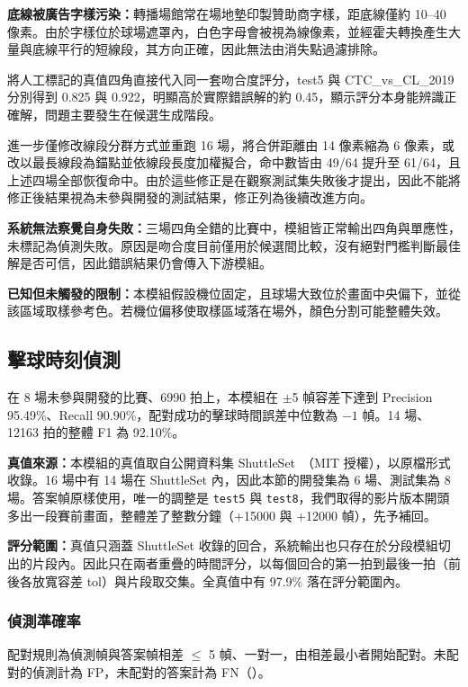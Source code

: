 \textbf{底線被廣告字樣污染：}轉播場館常在場地墊印製贊助商字樣，距底線僅約 10--40 像素。由於字樣位於球場遮罩內，白色字母會被視為線像素，並經霍夫轉換產生大量與底線平行的短線段，其方向正確，因此無法由消失點過濾排除。

將人工標記的真值四角直接代入同一套吻合度評分，test5 與 CTC\_vs\_CL\_2019 分別得到 0.825 與 0.922，明顯高於實際錯誤解的約 0.45，顯示評分本身能辨識正確解，問題主要發生在候選生成階段。

進一步僅修改線段分群方式並重跑 16 場，將合併距離由 14 像素縮為 6 像素，或改以最長線段為錨點並依線段長度加權擬合，命中數皆由 49/64 提升至 61/64，且上述四場全部恢復命中。由於這些修正是在觀察測試集失敗後才提出，因此不能將修正後結果視為未參與開發的測試結果，修正列為後續改進方向。

\textbf{系統無法察覺自身失敗：}三場四角全錯的比賽中，模組皆正常輸出四角與單應性，未標記為偵測失敗。原因是吻合度目前僅用於候選間比較，沒有絕對門檻判斷最佳解是否可信，因此錯誤結果仍會傳入下游模組。

\textbf{已知但未觸發的限制：}本模組假設機位固定，且球場大致位於畫面中央偏下，並從該區域取樣參考色。若機位偏移使取樣區域落在場外，顏色分割可能整體失效。

\subsection{擊球時刻偵測}
\label{sec:exp-events}

在 8 場未參與開發的比賽、6990 拍上，本模組在 $\pm$5 幀容差下達到 Precision 95.49\%、Recall 90.90\%，配對成功的擊球時間誤差中位數為 $-1$ 幀。14 場、12163 拍的整體 F1 為 92.10\%。

\textbf{真值來源：}本模組的真值取自公開資料集 ShuttleSet~\cite{shuttleset}（MIT 授權），以原檔形式收錄。16 場中有 14 場在 ShuttleSet 內，因此本節的開發集為 6 場、測試集為 8 場。答案幀原樣使用，唯一的調整是 \texttt{test5} 與 \texttt{test8}，我們取得的影片版本開頭多出一段賽前畫面，整體差了整數分鐘（+15000 與 +12000 幀），先予補回。

\textbf{評分範圍：}真值只涵蓋 ShuttleSet 收錄的回合，系統輸出也只存在於分段模組切出的片段內。因此只在兩者重疊的時間評分，以每個回合的第一拍到最後一拍（前後各放寬容差 tol）與片段取交集。全真值中有 97.9\% 落在評分範圍內。

\subsubsection{偵測準確率}

配對規則為偵測幀與答案幀相差 $\leq$ 5 幀、一對一，由相差最小者開始配對。未配對的偵測計為 FP，未配對的答案計為 FN（）。

